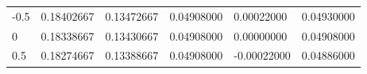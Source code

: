 \begin{tabular}{llllll}
-0.5 & 0.18402667 & 0.13472667 & 0.04908000 & 0.00022000 & 0.04930000 \\
0 & 0.18338667 & 0.13430667 & 0.04908000 & 0.00000000 & 0.04908000 \\
0.5 & 0.18274667 & 0.13388667 & 0.04908000 & -0.00022000 & 0.04886000 \\
\end{tabular}

